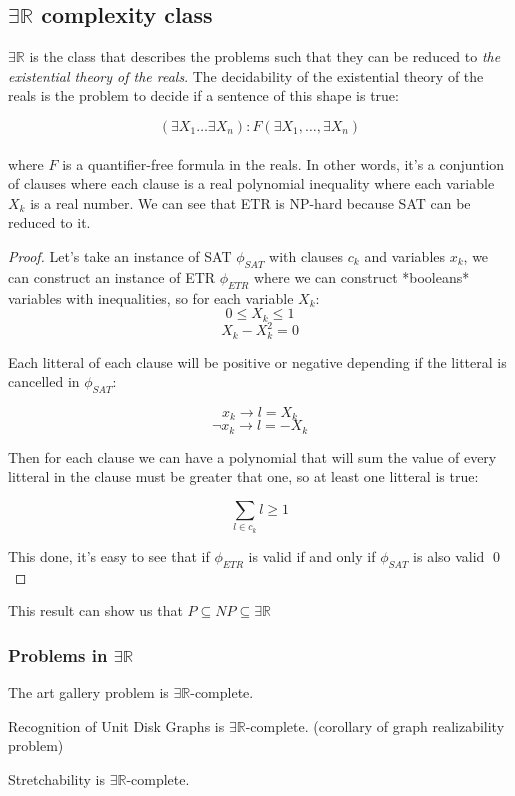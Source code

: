 \subsection{$\exists \mathbb{R}$ complexity class}

$\exists \mathbb{R}$ is the class that describes the problems such that they can be reduced to \textit{the existential theory of the reals}\cite{ExistentialTheoryReals2006}. The decidability of the existential theory of the reals is the problem to decide if a sentence of this shape is true:

$$(\exists X_1 \dots \exists X_n): F(\exists X_1, \dots,\exists X_n)$$\\

where $F$ is a quantifier-free formula in the reals. In other words, it's a conjuntion
of clauses where each clause is a real polynomial inequality where each variable $X_k$ is a real number. We can see that ETR is NP-hard because SAT can be reduced to it.


\begin{proof}
  Let's take an instance of SAT $\phi_{SAT}$ with clauses $c_k$ and variables $x_k$, we can construct an instance of ETR $\phi_{ETR}$ where we can construct *booleans* variables with inequalities, so for each variable $X_k$:
  $$0 \leq X_k \leq 1$$
  $$X_k - X_k^2 = 0$$

  Each litteral of each clause will be positive or negative depending if the litteral is cancelled in $\phi_{SAT}$:

  $$x_k \to l = X_k$$
  $$\neg x_k \to l = -X_k$$

  Then for each clause we can have a polynomial that will sum the value of every litteral in the clause must be greater that one, so at least one litteral is true:

  $$\sum_{l\in c_k} l \geq 1$$

  This done, it's easy to see that if $\phi_{ETR}$ is valid if and only if $\phi_{SAT}$ is also valid  \qed\\

\end{proof}

This result can show us that $P \subseteq NP \subseteq \exists \mathbb{R}$
\subsubsection{Problems in $\exists \mathbb{R}$}

The art gallery problem is $\exists \mathbb{R}$-complete.\cite{abrahamsenArtGalleryProblem2017}

Recognition of Unit Disk Graphs is $\exists \mathbb{R}$-complete. (corollary of graph realizability problem)\cite{Schaefer2013}

Stretchability is $\exists \mathbb{R}$-complete.
